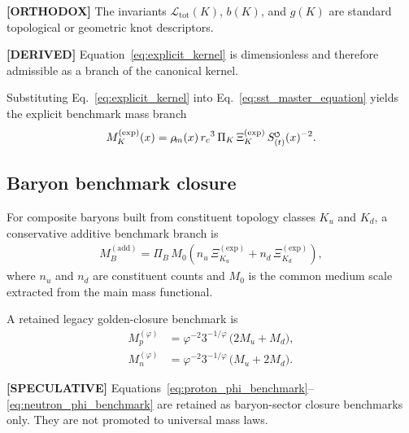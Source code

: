 \documentclass[11pt]{article}
\theoremstyle{definition}
\theoremstyle{plain}
\theoremstyle{remark}
\newcommand{\swirlarrow}{\mathchoice{\mkern-2mu\scriptstyle\boldsymbol{\circlearrowleft}}{\mkern-2mu\scriptstyle\boldsymbol{\circlearrowleft}}{\mkern-2mu\scriptscriptstyle\boldsymbol{\circlearrowleft}}{\mkern-2mu\scriptscriptstyle\boldsymbol{\circlearrowleft}}}
\newcommand{\rhoM}{\rho_{\!m}}
\newcommand{\SwirlClock}{{S_{(t)}^{\swirlarrow}}}
\newcommand{\rc}{{r_c}}
\begin{document}
        \textbf{[ORTHODOX]} The invariants \(\mathcal{L}_{\mathrm{tot}}(K)\), \(b(K)\), and \(g(K)\) are standard topological or geometric knot descriptors.
        
        \textbf{[DERIVED]} Equation~\eqref{eq:explicit_kernel} is dimensionless and therefore admissible as a branch of the canonical kernel.
        
        Substituting Eq.~\eqref{eq:explicit_kernel} into Eq.~\eqref{eq:sst_master_equation} yields the explicit benchmark mass branch
        \begin{align}
            M_K^{(\mathrm{exp})}(x)
            =
            \rhoM(x)\,\rc^3\,\Pi_K\,\Xi_K^{(\mathrm{exp})}\,\SwirlClock(x)^{-2}.
            \label{eq:explicit_mass_branch}
        \end{align}
    
    \subsection{Baryon benchmark closure}
        For composite baryons built from constituent topology classes \(K_u\) and \(K_d\), a conservative additive benchmark branch is
        \begin{align}
            M_B^{(\mathrm{add})}
            =
            \Pi_B\,M_0
            \left(
                n_u\,\Xi_{K_u}^{(\mathrm{exp})}
                +
                n_d\,\Xi_{K_d}^{(\mathrm{exp})}
            \right),
            \label{eq:baryon_additive_branch}
        \end{align}
        where \(n_u\) and \(n_d\) are constituent counts and \(M_0\) is the common medium scale extracted from the main mass functional.
        
        A retained legacy golden-closure benchmark is
        \begin{align}
            M_p^{(\varphi)}
            &=
            \varphi^{-2} 3^{-1/\varphi}\,\bigl(2M_u + M_d\bigr),
            \label{eq:proton_phi_benchmark}\\
            M_n^{(\varphi)}
            &=
            \varphi^{-2} 3^{-1/\varphi}\,\bigl(M_u + 2M_d\bigr).
            \label{eq:neutron_phi_benchmark}
        \end{align}
        
        \textbf{[SPECULATIVE]} Equations~\eqref{eq:proton_phi_benchmark}--\eqref{eq:neutron_phi_benchmark} are retained as baryon-sector closure benchmarks only. They are not promoted to universal mass laws.
    
\end{document}
